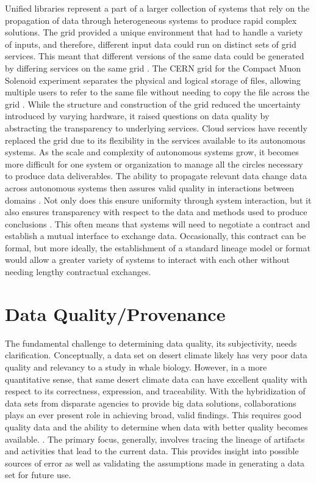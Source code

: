 Unified libraries represent a part of a larger collection of systems that rely on the propagation of data through heterogeneous systems to produce rapid complex solutions.
The grid provided a unique environment that had to handle a variety of inputs, and therefore, different input data could run on distinct sets of grid services.
This meant that different versions of the same data could be generated by differing services on the same grid \cite{Kovse2003VGridAVS}.
The CERN grid for the Compact Muon Solenoid experiment separates the physical and logical storage of files, allowing multiple users to refer to the same file without needing to copy the file across the grid \cite{Holtman:687353}.
While the structure and construction of the grid reduced the uncertainty introduced by varying hardware, it raised questions on data quality by abstracting the transparency to underlying services.
Cloud services have recently replaced the grid due to its flexibility in the services available to its autonomous systems.
As the scale and complexity of autonomous systems grow, it becomes more difficult for one system or organization to manage all the circles necessary to produce data deliverables.
The ability to propagate relevant data change data across autonomous systems then assures valid quality in interactions between domains \cite{Systems02champagne:data}.
Not only does this ensure uniformity through system interaction, but it also ensures transparency with respect to the data and methods used to produce conclusions \cite{Tagger2005}.
This often means that systems will need to negotiate a contract and establish a mutual interface to exchange data.
Occasionally, this contract can be formal, but more ideally, the establishment of a standard lineage model or format would allow a greater variety of systems to interact with each other without needing lengthy contractual exchanges.

\section{Data Quality/Provenance}

The fundamental challenge to determining data quality, its subjectivity, needs clarification.
Conceptually, a data set on desert climate likely has very poor data quality and relevancy to a study in whale biology.
However, in a more quantitative sense, that same desert climate data can have excellent quality with respect to its correctness, expression, and traceability.
With the hybridization of data sets from disparate agencies to provide big data solutions, collaborations plays an ever present role in achieving broad, valid findings.
This requires good quality data and the ability to determine when data with better quality becomes available. \cite{Wiil:2000:RDH:338407.338517}.
The primary focus, generally, involves tracing the lineage of artifacts and activities that lead to the current data.
This provides insight into possible sources of error as well as validating the assumptions made in generating a data set for future use.

